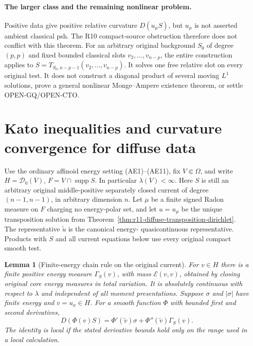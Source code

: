 \documentclass[11pt,a4paper]{article}
\numberwithin{equation}{section}
\newtheorem{lemma}[theorem]{Lemma}
\theoremstyle{definition}
\theoremstyle{remark}
\begin{document}
\paragraph{The larger class and the remaining nonlinear problem.}
Positive data give positive relative curvature $D(u_\mu S)$,
but $u_\mu$ is not asserted ambient classical psh.  The R10
compact-source obstruction therefore does not conflict with
this theorem.  For an arbitrary original background $S_0$
of degree $(p,p)$ and fixed bounded classical slots
$v_2,\ldots,v_{n-p}$, the entire construction applies to
$S=T_{S_0,n-p-1}(v_2,\ldots,v_{n-p})$.  It solves one free
relative slot on every original test.  It does not construct
a diagonal product of several moving $L^1$ solutions, prove a
general nonlinear Monge--Ampere existence theorem, or settle
OPEN-GQ/OPEN-CTO.



\section{Kato inequalities and curvature convergence for diffuse data}
\label{sec:r11-diffuse-Kato}

Use the ordinary affinoid energy setting (AE1)--(AE11), fix
$V\Subset\Omega$, and write $H=\mathscr D_0(V)$,
$F=V\cap\operatorname{supp}S$.  In particular $\lambda(V)<\infty$.
Here $S$ is still an arbitrary original middle-positive separately
closed current of degree $(n-1,n-1)$, in arbitrary dimension $n$.
Let $\mu$ be a finite signed Radon measure on $F$ charging no
energy-polar set, and let $u=u_\mu$ be the unique transposition
solution from Theorem~\ref{thm:r11-diffuse-transposition-dirichlet}.
The representative $\widetilde u$ is the canonical energy-
quasicontinuous representative.  Products with $S$ and all
current equations below use every original compact smooth test.

\begin{lemma}[Finite-energy chain rule on the original current]
\label{lem:r11-H-original-chain}
For $v\in H$ there is a finite positive energy measure
$\Gamma_S(v)$, with mass $\mathcal E(v,v)$, obtained by closing
original core energy measures in total variation.  It is absolutely
continuous with respect to $\lambda$ and independent of all moment
presentations.  Suppose $\sigma$ and $|\sigma|$ have finite energy
and $v=u_\sigma\in H$.  For a smooth function $\Phi$ with bounded
first and second derivatives,
\[
 D(\Phi(v)S)=\Phi'(\widetilde v)\sigma
                            +\Phi''(\widetilde v)\Gamma_S(v).
 \tag{KT1}
\]
The identity is local if the stated derivative bounds hold only
on the range used in a local calculation.
\end{lemma}
\end{document}
